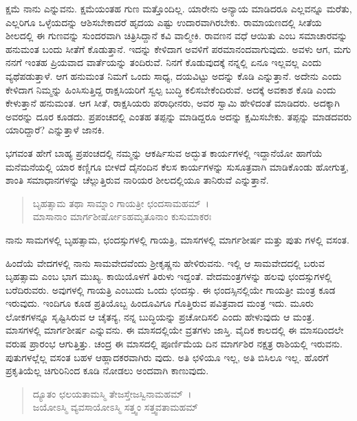 ಕ್ಷಮೆ ನಾನು ಎನ್ನುವನು. ಕ್ಷಮೆಯಂತಹ ಗುಣ ಮತ್ತೊಂದಿಲ್ಲ. ಯಾರೇನು ಅನ್ಯಾಯ ಮಾಡಿದರೂ ಎಲ್ಲವನ್ನೂ ಮರೆತು, ಎಲ್ಲರಿಗೂ ಒಳ್ಳೆಯದನ್ನು ಆಶಿಸಬೇಕಾದರೆ ಹೃದಯ ಎಷ್ಟು ಉದಾರವಾಗಿರಬೇಕು. ರಾಮಾಯಣದಲ್ಲಿ ಸೀತೆಯ ಶೀಲದಲ್ಲಿ ಈ ಗುಣವನ್ನು ಸುಂದರವಾಗಿ ಚಿತ್ರಿಸಿದ್ದಾನೆ ಕವಿ ವಾಲ್ಮೀಕಿ. ರಾವಣನ ವಧೆ ಆಯಿತು ಎಂಬ ಸಮಾಚಾರವನ್ನು ಹನುಮಂತ ಬಂದು ಸೀತೆಗೆ ಕೊಡುತ್ತಾನೆ. ಇದನ್ನು ಕೇಳಿದಾಗ ಅವಳಿಗೆ ಪರಮಾನಂದವಾಗುವುದು. ಅವಳು ಆಗ, ಮಗು ನನಗೆ ಇಂತಹ ಪ್ರಿಯವಾದ ವಾರ್ತೆಯನ್ನು ತಂದಿರುವೆ. ನಿನಗೆ ಕೊಡುವುದಕ್ಕೆ ನನ್ನಲ್ಲಿ ಏನೂ ಇಲ್ಲವಲ್ಲ ಎಂದು ವ್ಯಥೆಪಡುತ್ತಾಳೆ. ಆಗ ಹನುಮಂತ ನಿಮಗೆ ಒಂದು ಸಾಧ್ಯ, ದಯವಿಟ್ಟು ಅದನ್ನು ಕೊಡಿ ಎನ್ನುತ್ತಾನೆ. ಅದೇನು ಎಂದು ಕೇಳಿದಾಗ ನಿಮ್ಮನ್ನು ಹಿಂಸಿಸುತ್ತಿದ್ದ ರಾಕ್ಷಸಿಯರಿಗೆ ಸ್ವಲ್ಪ ಬುದ್ಧಿ ಕಲಿಸಬೇಕೆಂದಿರುವೆ. ಅದಕ್ಕೆ ಅವಕಾಶ ಕೊಡಿ ಎಂದು ಕೇಳುತ್ತಾನೆ ಹನುಮಂತ. ಆಗ ಸೀತೆ, ರಾಕ್ಷಸಿಯರು ಪರಾಧೀನರು, ಅವರ ಸ್ವಾಮಿ ಹೇಳಿದಂತೆ ಮಾಡಿದರು. ಅದಕ್ಕಾಗಿ ಅವರನ್ನು ದೂರ ಕೂಡದು. ಪ್ರಪಂಚದಲ್ಲಿ ಎಂತಹ ತಪ್ಪನ್ನು ಮಾಡಿದ್ದರೂ ಅದನ್ನು ಕ್ಷಮಿಸಬೇಕು. ತಪ್ಪನ್ನು ಮಾಡದವರು ಯಾರಿದ್ದಾರೆ? ಎನ್ನುತ್ತಾಳೆ ಜಾನಕಿ.

ಭಗವಂತ ಹೇಗೆ ಬಾಹ್ಯ ಪ್ರಪಂಚದಲ್ಲಿ ನಮ್ಮನ್ನು ಆಕರ್ಷಿಸುವ ಅದ್ಭುತ ಕಾರ್ಯಗಳಲ್ಲಿ ಇದ್ದಾನೆಯೋ ಹಾಗೆಯೆ ಮನೆಮನೆಯಲ್ಲಿ ಯಾರ ಕಣ್ಣಿಗೂ ಬೀಳದೆ ದೈನಂದಿನ ಕೆಲಸ ಕಾರ್ಯಗಳನ್ನು ಸುಸೂತ್ರವಾಗಿ ಮಾಡಿಕೊಂಡು ಹೋಗುತ್ತ, ಶಾಂತಿ ಸಮಾಧಾನಗಳನ್ನು ಚೆಲ್ಲುತ್ತಿರುವ ನಾರಿಯರ ಶೀಲದಲ್ಲಿಯೂ ತಾನಿರುವೆ ಎನ್ನುತ್ತಾನೆ.

\begin{verse}
ಬೃಹತ್ಸಾಮ ತಥಾ ಸಾಮ್ನಾಂ ಗಾಯತ್ರೀ ಛಂದಸಾಮಹಮ್~।\\ಮಾಸಾನಾಂ ಮಾರ್ಗಶೀರ್ಷೋಽಹಮೃತೂನಾಂ ಕುಸುಮಾಕರಃ 
\end{verse}

{\small ನಾನು ಸಾಮಗಳಲ್ಲಿ ಬೃಹತ್ಸಾಮ, ಛಂದಸ್ಸುಗಳಲ್ಲಿ ಗಾಯತ್ರಿ, ಮಾಸಗಳಲ್ಲಿ ಮಾರ್ಗಶೀರ್ಷ ಮತ್ತು ಪುತು ಗಳಲ್ಲಿ ವಸಂತ.}

ಹಿಂದೆಯೆ ವೇದಗಳಲ್ಲಿ ನಾನು ಸಾಮವೇದವೆಂದು ಶ‍್ರೀಕೃಷ್ಣನು ಹೇಳಿರುವನು. ಇಲ್ಲಿ ಆ ಸಾಮವೇದದಲ್ಲಿ ಬರುವ ಬೃಹತ್ಸಾಮ ಎಂಬ ಭಾಗ ಮುಖ್ಯ. ಕಾಯಿಯೊಳಗೆ ತಿರುಳು ಇದ್ದಂತೆ. ವೇದಮಂತ್ರಗಳನ್ನು ಹಲವು ಛಂದಸ್ಸುಗಳಲ್ಲಿ ಬರೆದಿರುವರು. ಅವುಗಳಲ್ಲಿ ಗಾಯತ್ರಿ ಎಂಬುದು ಒಂದು ಛಂದಸ್ಸು. ಈ ಛಂದಸ್ಸಿನಲ್ಲಿಯೇ ಗಾಯತ್ರೀ ಮಂತ್ರ ಕೂಡ ಇರುವುದು. ಇಂದಿಗೂ ಕೂಡ ಪ್ರತಿಯೊಬ್ಬ ಹಿಂದೂವಿಗೂ ಗೊತ್ತಿರುವ ಪವಿತ್ರವಾದ ಮಂತ್ರ ಇದು. ಮೂರು ಲೋಕಗಳನ್ನೂ ಸೃಷ್ಟಿಸಿರುವ ಆ ಚೈತನ್ಯ, ನನ್ನ ಬುದ್ಧಿಯನ್ನು ಪ್ರಚೋದಿಸಲಿ ಎಂದು ಹೇಳುವುದು ಆ ಮಂತ್ರ. ಮಾಸಗಳಲ್ಲಿ ಮಾರ್ಗಶೀರ್ಷ ಎನ್ನುವನು. ಈ ಮಾಸದಲ್ಲಿಯೇ ವ್ರತಗಳು ಜಾಸ್ತಿ. ವೈದಿಕ ಕಾಲದಲ್ಲಿ ಈ ಮಾಸದಿಂದಲೇ ವರುಷ ಪ್ರಾರಂಭ ಆಗುತ್ತಿತ್ತು. ಚಂದ್ರ ಈ ಮಾಸದಲ್ಲಿ ಪೂರ್ಣಿಮೆಯ ದಿನ ಮಾರ್ಗಶಿರ ನಕ್ಷತ್ರ ರಾಶಿಯಲ್ಲಿ ಇರುವನು. ಪುತುಗಳಲ್ಲೆಲ್ಲ ವಸಂತ ಬಹಳ ಆಹ್ಲಾದಕರವಾಗಿರು ವುದು. ಅತಿ ಛಳಿಯೂ ಇಲ್ಲ, ಅತಿ ಬಿಸಿಲೂ ಇಲ್ಲ. ಹೊರಗೆ ಪ್ರಕೃತಿಯೆಲ್ಲ ಚಿಗುರಿನಿಂದ ಕೂಡಿ ನೋಡಲು ಅಂದವಾಗಿ ಕಾಣುವುದು.

\begin{verse}
ದ್ಯೂತಂ ಛಲಯತಾಮಸ್ಮಿ ತೇಜಸ್ತೇಜಸ್ವಿನಾಮಹಮ್~।\\ಜಯೋಽಸ್ಮಿ ವ್ಯವಸಾಯೋಽಸ್ಮಿ ಸತ್ತ್ವಂ ಸತ್ತ್ವವತಾಮಹಮ್ 
\end{verse}


